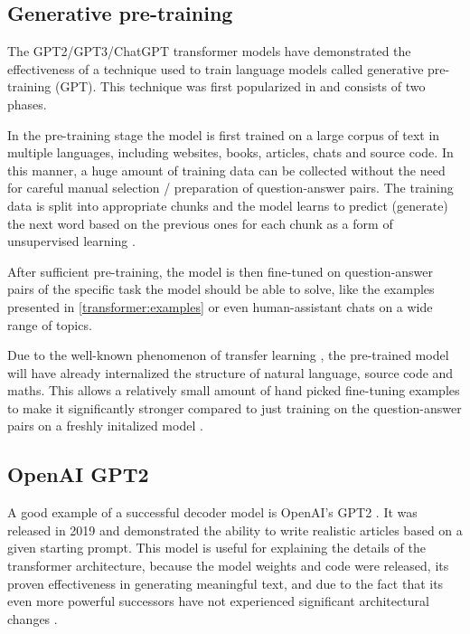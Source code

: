 \subsection{Generative pre-training}

The GPT2/GPT3/ChatGPT transformer models have demonstrated the effectiveness of a technique used to train language models called generative pre-training (GPT). This technique was first popularized in \cite{improvinglu} and consists of two phases.

In the pre-training stage the model is first trained on a large corpus of text in multiple languages, including websites, books, articles, chats and source code. In this manner, a huge amount of training data can be collected without the need for careful manual selection / preparation of question-answer pairs. The training data is split into appropriate chunks and the model learns to predict (generate) the next word based on the previous ones for each chunk as a form of unsupervised learning .

After sufficient pre-training, the model is then fine-tuned on question-answer pairs of the specific task the model should be able to solve, like the examples presented in \cref{transformer:examples} or even human-assistant chats on a wide range of topics.

Due to the well-known phenomenon of transfer learning \cite{transferlearning}, the pre-trained model will have already internalized the structure of natural language, source code and maths. 
This allows a relatively small amount of hand picked fine-tuning examples to make it significantly stronger compared to just training on the question-answer pairs on a freshly initalized model .

\subsection{OpenAI GPT2}

A good example of a successful decoder model is OpenAI's GPT2 \cite{unsupervisedmultitask} \cite{OpenAI2019BetterLM} \cite[source code]{HuggingFaceGPT2}. It was released in 2019 and demonstrated the ability to write realistic articles based on a given starting prompt. This model is useful for explaining the details of the transformer architecture, because the model weights and code were released, its proven effectiveness in generating meaningful text, and due to the fact that its even more powerful successors have not experienced significant architectural changes \cite{OpenGenus2023GPTComparison}.

